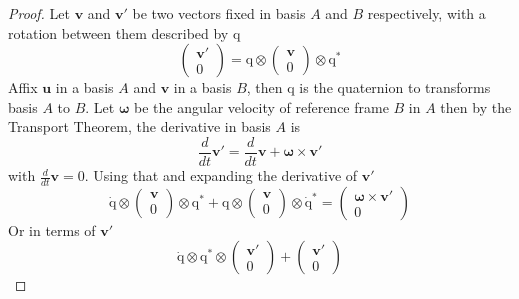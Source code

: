 \documentclass{amsart}
\theoremstyle{definition}
\theoremstyle{remark}
\numberwithin{equation}{section}
\begin{document}
\begin{proof}
  Let $\mathbf{v}$ and $\mathbf{v}'$ be two vectors fixed in basis $A$ and $B$ respectively, with a rotation between them described by $\mathrm{q}$
  \begin{equation}
    \begin{pmatrix}
      \mathbf{v}'\\
      0
    \end{pmatrix}
    = \mathrm{q} \otimes
    \begin{pmatrix}
      \mathbf{v} \\
      0
    \end{pmatrix}
    \otimes \mathrm{q}^*
  \end{equation}
  Affix $\mathbf{u}$ in a basis $A$ and $\mathbf{v}$ in a basis $B$, then $\mathrm{q}$ is the quaternion to transforms basis $A$ to $B$.
  Let $\boldsymbol\omega$ be the angular velocity of reference frame $B$ in $A$ then by the Transport Theorem, the derivative in basis $A$ is
  \begin{equation}
    \frac{d}{dt} \mathbf{v}' = \frac{d}{dt} \mathbf{v} + \boldsymbol\omega \times \mathbf{v}'
  \end{equation}
  with $\frac{d}{dt}\mathbf{v}=0$.
  Using that and expanding the derivative of $\mathbf{v}'$
  \begin{equation}
    \mathrm{\dot{q}} \otimes
    \begin{pmatrix}
      \mathbf{v} \\
      0
    \end{pmatrix}
    \otimes \mathrm{q}^* + \mathrm{q} \otimes
    \begin{pmatrix}
      \mathbf{v} \\
      0
    \end{pmatrix}
    \otimes \mathrm{\dot{q}^*} =
    \begin{pmatrix}
      \boldsymbol\omega\times\mathbf{v}' \\
      0
    \end{pmatrix}
  \end{equation}
  Or in terms of $\mathbf{v}'$
  \begin{equation}
    \mathrm{\dot{q}}\otimes\mathrm{q^*}\otimes
    \begin{pmatrix}
      \mathbf{v}'\\
      0
    \end{pmatrix}
    +
    \begin{pmatrix}
      \mathbf{v}'\\
      0
    \end{pmatrix}

\end{equation}
\end{proof}
\end{document}
